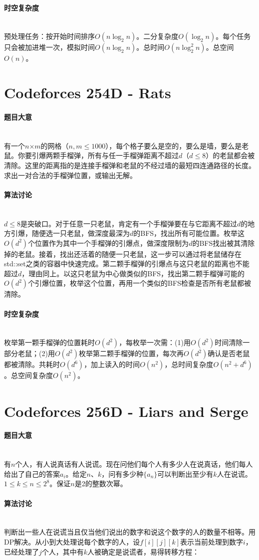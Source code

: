 \documentclass[UTF8]{ctexart}
\newcommand{\myparagraph}[1]{\paragraph{#1}\mbox{}\\}
\theoremstyle{nonumberplain}
\begin{document}
		\myparagraph{时空复杂度}
		
			预处理任务：按开始时间排序$O(n\log_2n)$。二分复杂度$O(\log_2n)$。每个任务只会被加进堆一次，模拟时间$O(n\log_2n)$。总时间$O(n\log_2^2n)$。总空间$O(n)$。
	
	\section{Codeforces 254D - Rats}
	
		\myparagraph{题目大意}
		
			有一个$n$×$m$的网格（$n,m \leq 1000$），每个格子要么是空的，要么是墙，要么是老鼠。你要引爆两颗手榴弹，所有与任一手榴弹距离不超过$d$（$d \leq 8$）的老鼠都会被清除。这里的距离指的是连接手榴弹和老鼠的不经过墙的最短四连通路径的长度。求出一对合法的手榴弹位置，或输出无解。
		
		\myparagraph{算法讨论}
		
			$d \leq 8$是突破口。对于任意一只老鼠，肯定有一个手榴弹要在与它距离不超过$d$的地方引爆，随便选一只老鼠，做深度最深为$d$的BFS，找出所有可能位置。枚举这$O(d^2)$个位置作为其中一个手榴弹的引爆点，做深度限制为$d$的BFS找出被其清除掉的老鼠。接着，找出还活着的随便一只老鼠，这一步可以通过将老鼠储存在std::set之类的容器中快速完成。第二颗手榴弹的引爆点与这只老鼠的距离也不能超过$d$，理由同上。以这只老鼠为中心做类似的BFS，找出第二颗手榴弹可能的$O(d^2)$个引爆位置，枚举这个位置，再用一个类似的BFS检查是否所有老鼠都被清除。
		
		\myparagraph{时空复杂度}
		
			枚举第一颗手榴弹的位置耗时$O(d^2)$，每枚举一次需：(1)用$O(d^2)$时间清除一部分老鼠；(2)用$O(d^2)$枚举第二颗手榴弹的位置，每次再$O(d^2)$确认是否老鼠都被清除。共耗时$O(d^6)$，加上读入的时间$O(n^2)$，总时间复杂度$O(n^2+d^6)$。总空间复杂度$O(n^2)$。
	
	\section{Codeforces 256D - Liars and Serge}
	
		\myparagraph{题目大意}
		
			有$n$个人，有人说真话有人说谎。现在问他们每个人有多少人在说真话，他们每人给出了自己的答案$a_i$。给定$n$、$k$，问有多少种$\{a_n\}$可以判断出至少有$k$人在说谎。$1 \leq k \leq n \leq 2^8$。保证$n$是2的整数次幂。
		
		\myparagraph{算法讨论}
		
			判断出一些人在说谎当且仅当他们说出的数字和说这个数字的人的数量不相等。用DP解决。从小到大处理说每个数字的人，设$f[i][j][k]$表示当前处理到数字$i$，已经处理了$j$个人，其中有$k$人被确定是说谎者，易得转移方程：
			
\end{document}
